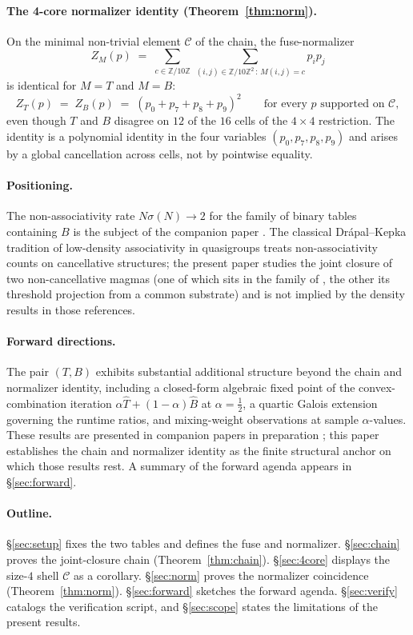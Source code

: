 \documentclass[11pt,reqno]{amsart}
\theoremstyle{plain}
\theoremstyle{definition}
\theoremstyle{remark}
\newcommand{\Z}{\mathbb{Z}}
\newcommand{\Zten}{\Z/10\Z}
\newcommand{\Cfour}{\mathcal{C}}
\newcommand{\fuseT}{\widehat{T}}
\newcommand{\fuseB}{\widehat{B}}
\begin{document}
\paragraph{The 4-core normalizer identity (Theorem~\ref{thm:norm}).}
On the minimal non-trivial element $\Cfour$ of the chain, the
fuse-normalizer
\[
Z_{M}(p)\;=\;\sum_{c\in\Zten}\,\sum_{(i,j)\in\Zten^{2}\,:\,M(i,j)=c}p_{i}p_{j}
\]
is identical for $M=T$ and $M=B$:
\[
Z_{T}(p)\;=\;Z_{B}(p)\;=\;(p_{0}+p_{7}+p_{8}+p_{9})^{2}\qquad\text{for every }p\text{ supported on }\Cfour,
\]
even though $T$ and $B$ disagree on $12$ of the $16$ cells of the
$4\times 4$ restriction. The identity is a polynomial identity in
the four variables $(p_{0},p_{7},p_{8},p_{9})$ and arises by a
global cancellation across cells, not by pointwise equality.

\paragraph{Positioning.} The non-associativity rate
$N\sigma(N)\to 2$ for the family of binary tables containing $B$
is the subject of the companion paper
\cite{SandersGish2026Sigma}. The classical Drápal--Kepka tradition
of low-density associativity in quasigroups
\cite{Kepka1980,DrapalKepka1985} treats non-associativity counts
on cancellative structures; the present paper studies the joint
closure of two non-cancellative magmas (one of which sits in the
family of \cite{SandersGish2026Sigma}, the other its threshold
projection from a common substrate) and is not implied by the
density results in those references.

\paragraph{Forward directions.} The pair $(T,B)$ exhibits
substantial additional structure beyond the chain and normalizer
identity, including a closed-form algebraic fixed point of the
convex-combination iteration $\alpha\fuseT+(1-\alpha)\fuseB$ at
$\alpha=\tfrac12$, a quartic Galois extension governing the
runtime ratios, and mixing-weight observations at sample
$\alpha$-values. These results are presented in companion papers
in preparation \cite{SandersGish2026FixedPoint,SandersGish2026MixingWeight};
this paper establishes the chain and normalizer identity as the
finite structural anchor on which those results rest. A summary
of the forward agenda appears in \S\ref{sec:forward}.

\paragraph{Outline.} \S\ref{sec:setup} fixes the two tables and
defines the fuse and normalizer. \S\ref{sec:chain} proves the
joint-closure chain (Theorem~\ref{thm:chain}). \S\ref{sec:4core}
displays the size-$4$ shell $\Cfour$ as a corollary.
\S\ref{sec:norm} proves the normalizer coincidence
(Theorem~\ref{thm:norm}). \S\ref{sec:forward} sketches the
forward agenda. \S\ref{sec:verify} catalogs the verification
script, and \S\ref{sec:scope} states the limitations of the
present results.
\end{document}
